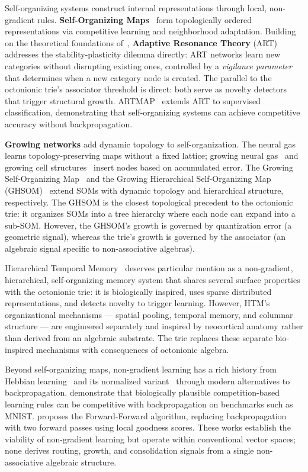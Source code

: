 \documentclass[11pt,a4paper]{article}
\theoremstyle{definition}
\theoremstyle{remark}
\begin{document}
Self-organizing systems construct internal representations through local, non-gradient rules. \textbf{Self-Organizing Maps}~\citep{Kohonen1982,Kohonen1990} form topologically ordered representations via competitive learning and neighborhood adaptation. Building on the theoretical foundations of~\citet{Grossberg1976a}, \textbf{Adaptive Resonance Theory} (ART)~\citep{CarpenterGrossberg1987a} addresses the stability-plasticity dilemma directly: ART networks learn new categories without disrupting existing ones, controlled by a \emph{vigilance parameter} that determines when a new category node is created. The parallel to the octonionic trie's associator threshold is direct: both serve as novelty detectors that trigger structural growth. ARTMAP~\citep{CarpenterGrossbergReynolds1991} extends ART to supervised classification, demonstrating that self-organizing systems can achieve competitive accuracy without backpropagation.

\textbf{Growing networks} add dynamic topology to self-organization. The neural gas~\citep{MartinetzSchulten1991} learns topology-preserving maps without a fixed lattice; growing neural gas~\citep{Fritzke1995} and growing cell structures~\citep{Fritzke1994} insert nodes based on accumulated error. The Growing Self-Organizing Map~\citep{Alahakoon2000} and the Growing Hierarchical Self-Organizing Map (GHSOM)~\citep{Rauber2002} extend SOMs with dynamic topology and hierarchical structure, respectively. The GHSOM is the closest topological precedent to the octonionic trie: it organizes SOMs into a tree hierarchy where each node can expand into a sub-SOM. However, the GHSOM's growth is governed by quantization error (a geometric signal), whereas the trie's growth is governed by the associator (an algebraic signal specific to non-associative algebras).

Hierarchical Temporal Memory~\citep{Hawkins2016} deserves particular mention as a non-gradient, hierarchical, self-organizing memory system that shares several surface properties with the octonionic trie: it is biologically inspired, uses sparse distributed representations, and detects novelty to trigger learning. However, HTM's organizational mechanisms --- spatial pooling, temporal memory, and columnar structure --- are engineered separately and inspired by neocortical anatomy rather than derived from an algebraic substrate. The trie replaces these separate bio-inspired mechanisms with consequences of octonionic algebra.

Beyond self-organizing maps, non-gradient learning has a rich history from Hebbian learning~\citep{Hebb1949} and its normalized variant~\citep{Oja1982} through modern alternatives to backpropagation. \citet{KrotovHopfield2019} demonstrate that biologically plausible competition-based learning rules can be competitive with backpropagation on benchmarks such as MNIST. \citet{Hinton2022} proposes the Forward-Forward algorithm, replacing backpropagation with two forward passes using local goodness scores. These works establish the viability of non-gradient learning but operate within conventional vector spaces; none derives routing, growth, and consolidation signals from a single non-associative algebraic structure.
\end{document}
